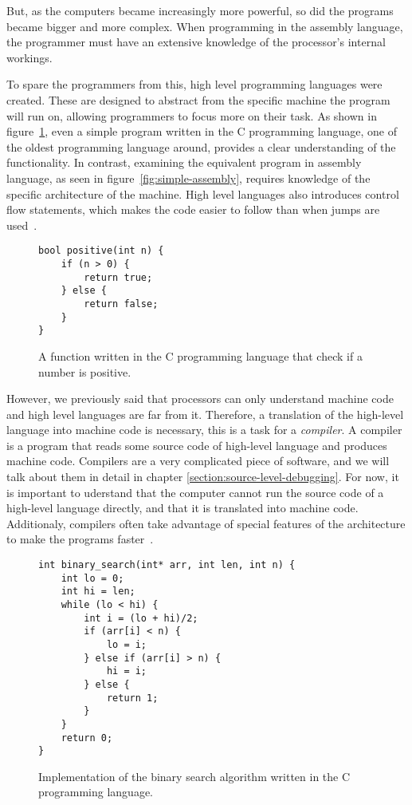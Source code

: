 But, as the computers became increasingly more powerful, so did the programs
became bigger and more complex. When programming in the assembly language,
the programmer must have an extensive knowledge of the processor's internal
workings.

To spare the programmers from this, high level programming languages were
created. These are designed to abstract from the specific machine the program
will run on, allowing programmers to focus more on their task. As shown in
figure~\ref{fig:c-positive}, even a simple program written in the C programming
language, one of the oldest programming language around, provides a clear
understanding of the functionality. In contrast, examining the equivalent
program in assembly language, as seen in figure~\ref{fig:simple-assembly},
requires knowledge of the specific architecture of the machine. High level
languages also introduces control flow statements, which makes the code easier
to follow than when jumps are used~\cite{gotobad}.

\begin{figure}
\begin{verbatim}
bool positive(int n) {
    if (n > 0) {
        return true;
    } else {
        return false;
    }
}
\end{verbatim}
\caption{A function written in the C programming language that check if a
    number is positive.}
\label{fig:c-positive}
\end{figure}

However, we previously said that processors can only understand machine code
and high level languages are far from it. Therefore, a translation of the
high-level language into machine code is necessary, this is a task for a
\textit{compiler}. A compiler is a program that reads some source code of
high-level language and produces machine code. Compilers are a very complicated
piece of software, and we will talk about them in detail in chapter
\ref{section:source-level-debugging}. For now, it is important to uderstand
that the computer cannot run the source code of a high-level language directly,
and that it is translated into machine code. Additionaly, compilers often take
advantage of special features of the architecture to make the programs
faster~\cite{dragon-book}.

\begin{figure}[H]
    \begin{verbatim}
int binary_search(int* arr, int len, int n) {
    int lo = 0;
    int hi = len;
    while (lo < hi) {
        int i = (lo + hi)/2;
        if (arr[i] < n) {
            lo = i;
        } else if (arr[i] > n) {
            hi = i;
        } else {
            return 1;
        }
    }
    return 0;
}
    \end{verbatim}
    \caption{Implementation of the binary search algorithm written in the C
    programming language.}
    \label{fig:binary-search}
\end{figure}

